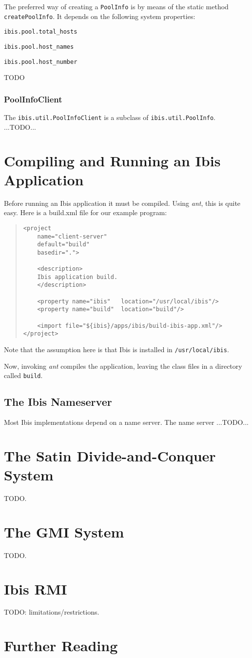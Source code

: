 \documentclass[10pt]{article}
\newcommand{\mysection}[1]{\section{#1}\label{#1}}
\newcommand{\mysubsection}[1]{\subsection{#1}\label{#1}}
\newcommand{\mysubsubsection}[1]{\subsubsection{#1}\label{#1}}
\begin{document}
The preferred way of creating a \verb+PoolInfo+ is by means of the
static method \verb+createPoolInfo+.
It depends on the following system properties:
\begin{description}
\item{\verb+ibis.pool.total_hosts+}
\item{\verb+ibis.pool.host_names+}
\item{\verb+ibis.pool.host_number+}
\end{description}

TODO

\mysubsubsection{PoolInfoClient}

The \verb+ibis.util.PoolInfoClient+ is a subclass of
\verb+ibis.util.PoolInfo+.  ...TODO...


\mysection{Compiling and Running an Ibis Application}

Before running an Ibis application it must be compiled.
Using \emph{ant}, this is quite easy. Here is a build.xml file for
our example program:

\begin{quote}
\begin{verbatim}
<project
    name="client-server"
    default="build"
    basedir=".">

    <description>
    Ibis application build.
    </description>

    <property name="ibis"   location="/usr/local/ibis"/>
    <property name="build"  location="build"/>

    <import file="${ibis}/apps/ibis/build-ibis-app.xml"/>
</project>
\end{verbatim}
\end{quote}
Note that the assumption here is that Ibis is installed in
\verb+/usr/local/ibis+.

Now, invoking \emph{ant} compiles the application, leaving the class files
in a directory called \verb+build+.

\mysubsection{The Ibis Nameserver}

Most Ibis implementations depend on a name server.
The name server ...TODO...

\mysection{The Satin Divide-and-Conquer System}

TODO.

\mysection{The GMI System}

TODO.

\mysection{Ibis RMI}

TODO: limitations/restrictions.

\mysection{Further Reading}
\end{document}
